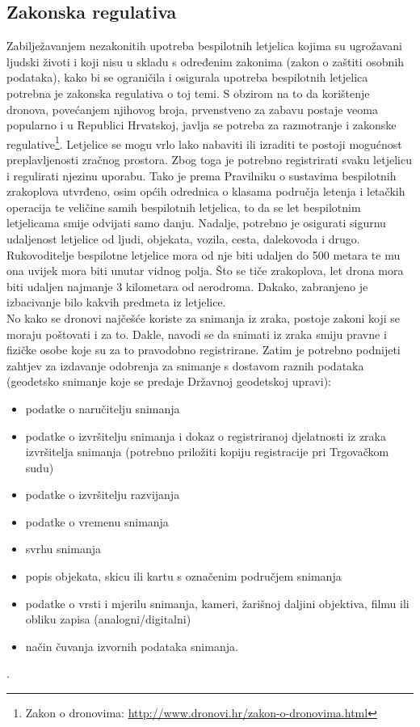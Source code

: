 \documentclass[times, utf8, diplomski]{fer}
\begin{document}
\subsection{Zakonska regulativa\citep{Ekscentar}} 
Zabilježavanjem nezakonitih upotreba bespilotnih letjelica kojima su ugrožavani ljudski životi i koji nisu u skladu s određenim zakonima (zakon o zaštiti osobnih podataka), kako bi se ograničila i osigurala upotreba bespilotnih letjelica potrebna je zakonska regulativa o toj temi. S obzirom na to da korištenje dronova, povećanjem njihovog broja, prvenstveno za zabavu postaje veoma popularno i u Republici Hrvatskoj, javlja se potreba za razmotranje i zakonske regulative\footnote{Zakon o dronovima: \url{http://www.dronovi.hr/zakon-o-dronovima.html}}.  Letjelice  se  mogu  vrlo  lako  nabaviti  ili  izraditi  te  postoji mogućnost preplavljenosti zračnog prostora. Zbog toga je potrebno registrirati svaku letjelicu i regulirati njezinu uporabu. Tako je prema Pravilniku o sustavima bespilotnih zrakoplova utvrđeno, osim općih odrednica o klasama područja letenja i letačkih operacija te veličine samih bespilotnih letjelica, to da se let bespilotnim letjelicama smije odvijati samo danju. Nadalje, potrebno je osigurati sigurnu udaljenost letjelice od ljudi, objekata, vozila, cesta, dalekovoda i drugo. Rukovoditelje bespilotne letjelice mora od nje biti udaljen do 500 metara te mu ona uvijek mora biti unutar vidnog polja. Što se tiče zrakoplova, let  drona  mora  biti  udaljen  najmanje  3  kilometara  od  aerodroma.  Dakako,  zabranjeno  je izbacivanje bilo kakvih predmeta iz letjelice. \\
No kako se dronovi najčešće koriste za snimanja iz zraka, postoje zakoni koji se moraju poštovati i za to. Dakle, navodi se da snimati iz zraka smiju pravne i fizičke osobe koje su za to pravodobno registrirane. Zatim je potrebno podnijeti zahtjev za izdavanje odobrenja za snimanje s dostavom  raznih  podataka (geodetsko snimanje koje se predaje Državnoj geodetskoj upravi):
\begin{itemize}
\item podatke o naručitelju snimanja
\item podatke o izvršitelju snimanja i dokaz o registriranoj djelatnosti iz zraka izvršitelja snimanja (potrebno priložiti kopiju registracije pri Trgovačkom sudu)
\item podatke o izvršitelju razvijanja
\item podatke o vremenu snimanja
\item svrhu snimanja
\item popis objekata, skicu ili kartu s označenim područjem snimanja
\item podatke o vrsti i mjerilu snimanja, kameri, žarišnoj daljini objektiva, filmu ili obliku zapisa (analogni/digitalni)
\item način čuvanja izvornih podataka snimanja.
\end{itemize}.
\end{document}

